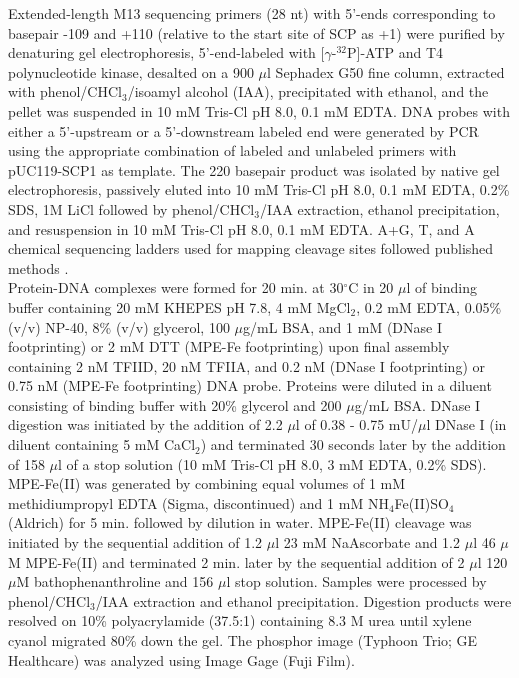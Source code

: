 Extended-length M13 sequencing primers (28 nt) with 5'-ends corresponding to basepair -109 and +110 (relative to the start site of SCP as +1) were purified by denaturing gel electrophoresis, 5'-end-labeled with [$\gamma$-$^{32}$P]-ATP and T4 polynucleotide kinase, desalted on a 900 $\mu$l Sephadex G50 fine column, extracted with phenol/CHCl$_{3}$/isoamyl alcohol (IAA), precipitated with ethanol, and the pellet was suspended in 10 mM Tris-Cl pH 8.0, 0.1 mM EDTA. DNA probes with either a 5'-upstream or a 5'-downstream labeled end were generated by PCR using the appropriate combination of labeled and unlabeled primers with pUC119-SCP1 \cite{Juven-Gershon_1249} as template.  The 220 basepair product was isolated by native gel electrophoresis, passively eluted into 10 mM Tris-Cl pH 8.0, 0.1 mM EDTA, 0.2\% SDS, 1M LiCl  followed by phenol/CHCl$_{3}$/IAA extraction, ethanol precipitation, and resuspension in 10 mM Tris-Cl pH 8.0, 0.1 mM EDTA. A+G, T, and A chemical sequencing ladders used for mapping cleavage sites followed published methods \cite{Iverson_3815,Sambrook_3729}.\\
\indent Protein-DNA complexes were formed for 20 min. at 30$^{\circ}$C in 20 $\mu$l of binding buffer containing 20 mM KHEPES pH 7.8, 4 mM MgCl$_{2}$, 0.2 mM EDTA, 0.05\% (v/v) NP-40, 8\% (v/v) glycerol, 100 $\mu$g/mL BSA, and 1 mM (DNase I footprinting) or 2 mM DTT (MPE-Fe footprinting) upon final assembly containing 2 nM TFIID, 20 nM TFIIA, and 0.2 nM (DNase I footprinting) or 0.75 nM (MPE-Fe footprinting) DNA probe.  Proteins were diluted in a diluent consisting of binding buffer with 20\% glycerol and 200 $\mu$g/mL BSA.  DNase I digestion was initiated by the addition of 2.2 $\mu$l of 0.38 - 0.75 mU/$\mu$l DNase I (in diluent containing 5 mM CaCl$_{2}$) and terminated 30 seconds later by the addition of 158 $\mu$l of a stop solution (10 mM Tris-Cl pH 8.0, 3 mM EDTA, 0.2\% SDS).  MPE-Fe(II) was generated by combining equal volumes of 1 mM methidiumpropyl EDTA (Sigma, discontinued) and 1 mM NH$_{4}$Fe(II)SO$_{4}$ (Aldrich) for 5 min. followed by dilution in water.  MPE-Fe(II) cleavage was initiated by the sequential addition of 1.2 $\mu$l 23 mM NaAscorbate and 1.2 $\mu$l 46 $\mu$M MPE-Fe(II) and terminated 2 min. later by the sequential addition of 2 $\mu$l 120 $\mu$M bathophenanthroline and 156 $\mu$l stop solution.  Samples were processed by phenol/CHCl$_{3}$/IAA extraction and ethanol precipitation.  Digestion products were resolved on 10\% polyacrylamide (37.5:1) containing 8.3 M urea until xylene cyanol migrated 80\% down the gel.  The phosphor image (Typhoon Trio; GE Healthcare) was analyzed using Image Gage (Fuji Film). 


